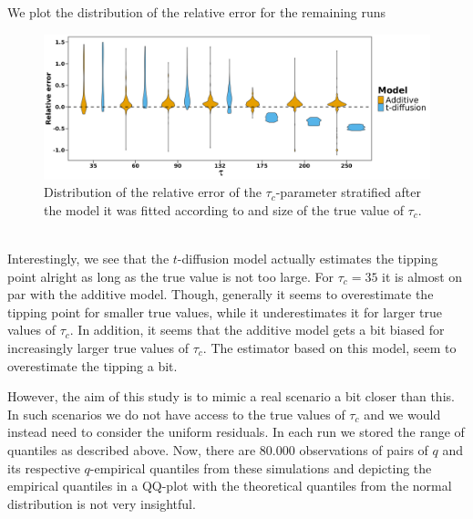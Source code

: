 We plot the distribution of the relative error for the remaining runs 
\begin{figure}[h!]
    \begin{center}
    \includegraphics[scale = .075]{figures/RE_dist_tau.jpeg}
    \caption{Distribution of the relative error of the $\tau_c$-parameter stratified after the model it was fitted according to and size of the true value of $\tau_c$.}
    \label{figure:RE_dist_tau}
    \end{center}
\end{figure}\\
Interestingly, we see that the $t$-diffusion model actually estimates the tipping point alright as long as the true value is not too large. For $\tau_c = 35$ it is almost on par with the additive model. Though, generally it seems to overestimate the tipping point for smaller true values, while it underestimates it for larger true values of $\tau_c$. In addition, it seems that the additive model gets a bit biased for increasingly larger true values of $\tau_c$. The estimator based on this model, seem to overestimate the tipping a bit. 

However, the aim of this study is to mimic a real scenario a bit closer than this. In such scenarios we do not have access to the true values of $\tau_c$ and we would instead need to consider the uniform residuals. In each run we stored the range of quantiles as described above. Now, there are $80.000$ observations of pairs of $q$ and its respective $q$-empirical quantiles from these simulations and depicting the empirical quantiles in a QQ-plot with the theoretical quantiles from the normal distribution is not very insightful.


